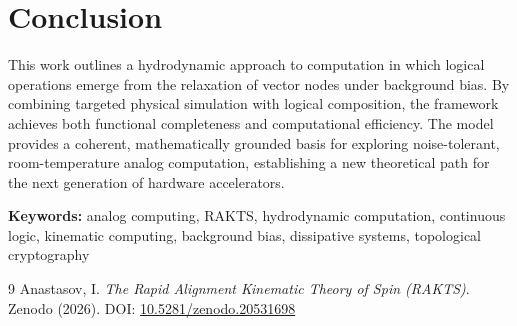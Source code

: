 \documentclass[12pt]{article}
\begin{document}
\section{Conclusion}
This work outlines a hydrodynamic approach to computation in which logical operations emerge from the relaxation of vector nodes under background bias. By combining targeted physical simulation with logical composition, the framework achieves both functional completeness and computational efficiency. The model provides a coherent, mathematically grounded basis for exploring noise-tolerant, room-temperature analog computation, establishing a new theoretical path for the next generation of hardware accelerators.

\vspace{1em}
\noindent \textbf{Keywords:} analog computing, RAKTS, hydrodynamic computation, continuous logic, kinematic computing, background bias, dissipative systems, topological cryptography

\begin{thebibliography}{9}
Anastasov, I. 
\textit{The Rapid Alignment Kinematic Theory of Spin (RAKTS)}. 
Zenodo (2026). DOI: \href{https://doi.org/10.5281/zenodo.20531698}{10.5281/zenodo.20531698}
\end{thebibliography}
\end{document}

